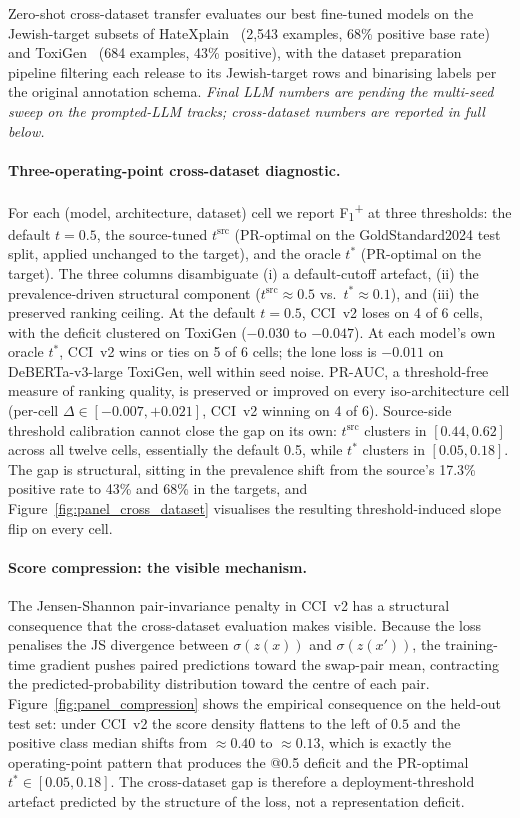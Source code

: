 Zero-shot cross-dataset transfer evaluates our best fine-tuned models on the Jewish-target subsets of HateXplain~\citep{mathew2021hatexplain} (2{,}543 examples, 68\% positive base rate) and ToxiGen~\citep{hartvigsen2022toxigen} (684 examples, 43\% positive), with the dataset preparation pipeline filtering each release to its Jewish-target rows and binarising labels per the original annotation schema. \emph{Final LLM numbers are pending the multi-seed sweep on the prompted-LLM tracks; cross-dataset numbers are reported in full below.}

\paragraph{Three-operating-point cross-dataset diagnostic.}
For each (model, architecture, dataset) cell we report F\textsubscript{1}\textsuperscript{+} at three thresholds: the default $t = 0.5$, the source-tuned $t^{\mathrm{src}}$ (PR-optimal on the GoldStandard2024 test split, applied unchanged to the target), and the oracle $t^* $ (PR-optimal on the target). The three columns disambiguate (i) a default-cutoff artefact, (ii) the prevalence-driven structural component ($t^{\mathrm{src}} \approx 0.5$ vs.\ $t^* \approx 0.1$), and (iii) the preserved ranking ceiling. At the default $t = 0.5$, CCI~v2 loses on 4 of 6 cells, with the deficit clustered on ToxiGen ($-0.030$ to $-0.047$). At each model's own oracle $t^*$, CCI~v2 wins or ties on 5 of 6 cells; the lone loss is $-0.011$ on DeBERTa-v3-large ToxiGen, well within seed noise. PR-AUC, a threshold-free measure of ranking quality, is preserved or improved on every iso-architecture cell (per-cell $\Delta \in [-0.007, +0.021]$, CCI~v2 winning on 4 of 6). Source-side threshold calibration cannot close the gap on its own: $t^{\mathrm{src}}$ clusters in $[0.44, 0.62]$ across all twelve cells, essentially the default 0.5, while $t^* $ clusters in $[0.05, 0.18]$. The gap is structural, sitting in the prevalence shift from the source's 17.3\% positive rate to 43\% and 68\% in the targets, and Figure~\ref{fig:panel_cross_dataset} visualises the resulting threshold-induced slope flip on every cell.

\paragraph{Score compression: the visible mechanism.}
The Jensen-Shannon pair-invariance penalty in CCI~v2 has a structural consequence that the cross-dataset evaluation makes visible. Because the loss penalises the JS divergence between $\sigma(z(x))$ and $\sigma(z(x'))$, the training-time gradient pushes paired predictions toward the swap-pair mean, contracting the predicted-probability distribution toward the centre of each pair. Figure~\ref{fig:panel_compression} shows the empirical consequence on the held-out test set: under CCI~v2 the score density flattens to the left of $0.5$ and the positive class median shifts from $\approx 0.40$ to $\approx 0.13$, which is exactly the operating-point pattern that produces the @0.5 deficit and the PR-optimal $t^* \in [0.05, 0.18]$. The cross-dataset gap is therefore a deployment-threshold artefact predicted by the structure of the loss, not a representation deficit.

